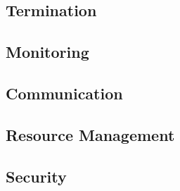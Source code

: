 \subsection{Termination}
\label{ch:fundamentals/processes/termination}
\subsection{Monitoring}
\label{ch:fundamentals/processes/monitoring}
\subsection{Communication}
\label{ch:fundamentals/processes/communication}
\subsection{Resource Management}
\label{ch:fundamentals/processes/resource-management}
\subsection{Security}
\label{ch:fundamentals/processes/security}